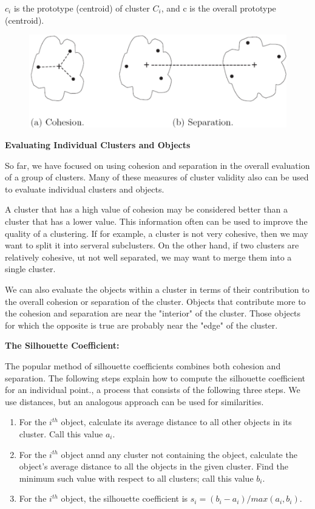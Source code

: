 			$c_{i}$ is the prototype (centroid) of cluster $C_{i}$, and c is the overall
			prototype (centroid). 

			\begin{figure}[H]
				\centering
				\includegraphics[scale=0.3]{pics/prototypebased.png}
			\end{figure}

			{\bf Evaluating Individual Clusters and Objects}

				So far, we have focused on using cohesion and separation in the overall
				evaluation of a group of clusters. Many of these measures of cluster
				validity also can be used to evaluate individual clusters and objects.

				A cluster that has a high value of cohesion may be considered better than
				a cluster that has a lower value. This information often can be used to 
				improve the quality of a clustering. If for example, a cluster is not
				very cohesive, then we may want to split it into serveral subclusters. 
				On the other hand, if two clusters are relatively cohesive, ut not
				well separated, we may want to merge them into a single cluster. 

				We can also evaluate the objects within a cluster in terms of their
				contribution to the overall cohesion or separation of the cluster. 
				Objects that contribute more to the cohesion and separation are near the 
				"interior" of the cluster. Those objects for which the opposite is true
				are probably near the "edge" of the cluster. 

				{\bf The Silhouette Coefficient:}

				The popular method of silhouette coefficients combines both cohesion and
				separation. The following steps explain how to compute the silhouette coefficient
				for an individual point., a process that consists of the following three steps.
				We use distances, but an analogous approach can be used for similarities.

				\begin{enumerate}
					\item For the $i^{th}$ object, calculate its average distance to all other
					objects in its cluster. Call this value $a_{i}$.
					\item For the $i^{th}$ object annd any cluster not containing the object,
					calculate the object's average distance to all the objects in the given
					cluster. Find the minimum such value with respect to all clusters; call
					this value $b_{i}$.
					\item For the $i^{th}$ object, the silhouette coefficient is 
					$s_{i} = (b_{i} - a_{i})/max(a_{i},b_{i})$.
				\end{enumerate}


